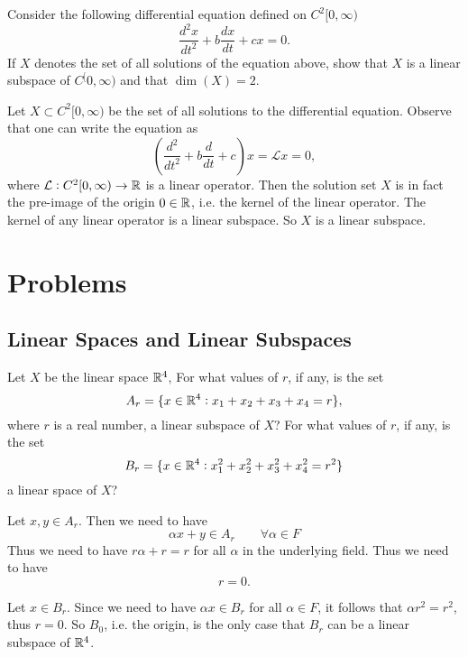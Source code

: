  
 
 
 \begin{summary}
 	\begin{problem}
 		Consider the following differential equation defined on $ C^2[0,\infty) $
 		\[ \frac{d^2x}{dt^2} + b\frac{dx}{dt} + cx = 0. \]
 		If $ X $ denotes the set of all solutions of the equation above, show that $ X $ is a linear subspace of $ C^[0,\infty) $ and that $ \dim(X) = 2 $.
 	\end{problem}
 	\begin{solution}
 		Let $ X \subset C^2[0,\infty) $ be the set of all solutions to the differential equation. Observe that one can write the equation as
 		\[ (\frac{d^2}{dt^2} + b\frac{d}{dt} + c)x = \mathcal{L}x = 0, \]
 		where $ \mathcal{L}: C^2[0,\infty) \to \mathbb{R} $ is a linear operator. Then the solution set $ X $ is in fact the pre-image of the origin $ 0\in \mathbb{R} $, i.e. the kernel of the linear operator. The kernel of any linear operator is a linear subspace. So $ X $ is a linear subspace. 
 	\end{solution}
 \end{summary}
 
 
 
 
 
 


\section{Problems}

\subsection{Linear Spaces and Linear Subspaces}
\begin{problem}
	Let $ X $ be the linear space $ \mathbb{R}^4 $, For what values of $ r $, if any, is the set
	\[ A_r = \{x\in\mathbb{R}^4: x_1+x_2+x_3+x_4 = r\}, \]
	where $ r $ is a real number, a linear subspace of $ X $? For what values of $ r $, if any,
	is the set
	\[ B_r = \{x\in \mathbb{R}^4: x_1^2 + x_2^2 + x_3^2+x_4^2 = r^2\} \]
	a linear space of $ X $?
\end{problem}

\begin{solution}
	Let $ x,y \in A_r $. Then we need to have
	\[ \alpha x + y \in A_r \qquad \forall\alpha\in F \]
	Thus we need to have $ r\alpha + r = r $ for all $ \alpha $ in the underlying field. Thus we need to have
	\[ r = 0. \]
	
	Let $ x \in B_r $. Since we need to have $ \alpha x \in B_r $ for all $ \alpha\in F $, it follows that $ \alpha r^2 = r^2 $, thus $ r=0 $. So $ B_0 $, i.e. the origin, is the only case that $ B_r $ can be a linear subspace of $ \mathbb{R}^4 $.
\end{solution}


